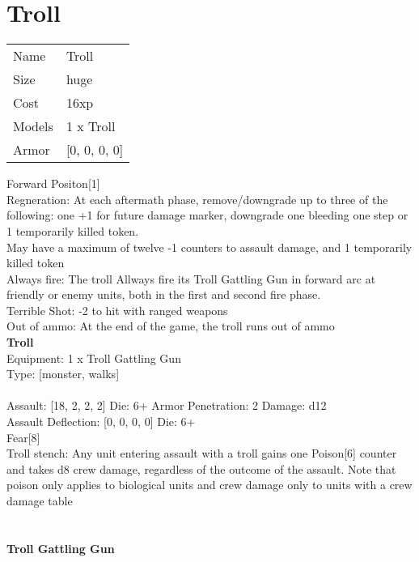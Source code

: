\pagebreak

\section{ Troll }

\begin{tabular}{ll}
  Name & Troll \\
  Size & huge\\
  Cost & 16xp\\
  Models & 1 x Troll\\
  Armor & [0, 0, 0, 0]\\
\end{tabular}

\noindent Forward Positon[1]\\ 
Regneration: At each aftermath phase, remove/downgrade up to three of the following: one +1 for future damage marker, downgrade one bleeding one step or 1 temporarily killed token.\\ 
May have a maximum of twelve -1 counters to assault damage, and 1 temporarily killed token\\ 
Always fire: The troll Allways fire its Troll Gattling Gun in forward arc at friendly or enemy units, both in the first and second fire phase.\\ 
Terrible Shot: -2 to hit with ranged weapons\\ 
Out of ammo: At the end of the game, the troll runs out of ammo\\ 


{\bf Troll } \\
Equipment: 1 x Troll Gattling Gun \\
Type: [monster, walks] \\
\ \\
Assault: [18, 2, 2, 2] Die: 6+ Armor Penetration: 2 Damage: d12 \\
Assault Deflection: [0, 0, 0, 0] Die: 6+\\
\indent Fear[8]\\ 
Troll stench: Any unit entering assault with a troll gains one Poison[6] counter and takes d8 crew damage, regardless of the outcome of the assault. Note that poison only applies to biological units and crew damage only to units with a crew damage table\\ 
 
\ \\

\ \\
{\bf Troll Gattling Gun } \\



